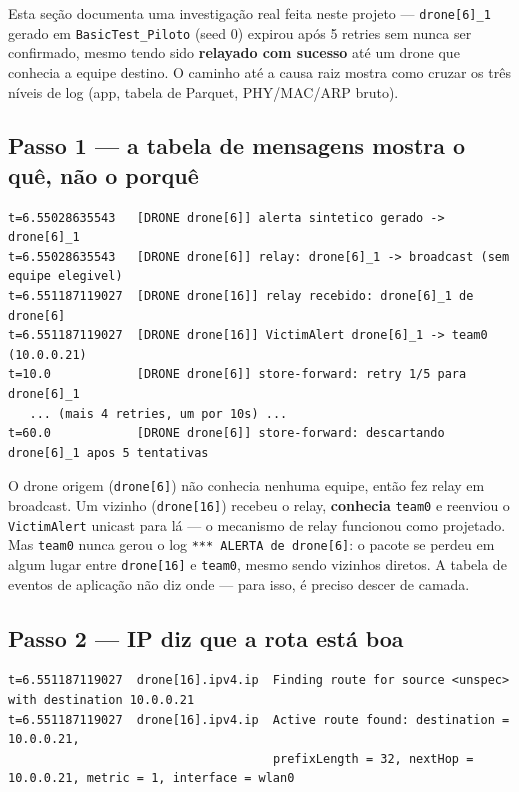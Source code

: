 \documentclass[11pt,a4paper]{article}
\begin{document}
Esta seção documenta uma investigação real feita neste projeto ---
\texttt{drone[6]\_1} gerado em \texttt{BasicTest\_Piloto} (seed 0) expirou
após 5 retries sem nunca ser confirmado, mesmo tendo sido \textbf{relayado
com sucesso} até um drone que conhecia a equipe destino. O caminho até a
causa raiz mostra como cruzar os três níveis de log (app, tabela de
Parquet, PHY/MAC/ARP bruto).

\subsection{Passo 1 --- a tabela de mensagens mostra o quê, não o porquê}

\begin{lstlisting}[style=simlog]
t=6.55028635543   [DRONE drone[6]] alerta sintetico gerado -> drone[6]_1
t=6.55028635543   [DRONE drone[6]] relay: drone[6]_1 -> broadcast (sem equipe elegivel)
t=6.551187119027  [DRONE drone[16]] relay recebido: drone[6]_1 de drone[6]
t=6.551187119027  [DRONE drone[16]] VictimAlert drone[6]_1 -> team0 (10.0.0.21)
t=10.0            [DRONE drone[6]] store-forward: retry 1/5 para drone[6]_1
   ... (mais 4 retries, um por 10s) ...
t=60.0            [DRONE drone[6]] store-forward: descartando drone[6]_1 apos 5 tentativas
\end{lstlisting}

\begin{explica}
O drone origem (\texttt{drone[6]}) não conhecia nenhuma equipe, então fez
relay em broadcast. Um vizinho (\texttt{drone[16]}) recebeu o relay,
\textbf{conhecia} \texttt{team0} e reenviou o \texttt{VictimAlert} unicast
para lá --- o mecanismo de relay funcionou como projetado. Mas
\texttt{team0} nunca gerou o log \texttt{*** ALERTA de drone[6]}: o pacote
se perdeu em algum lugar entre \texttt{drone[16]} e \texttt{team0}, mesmo
sendo vizinhos diretos. A tabela de eventos de aplicação não diz onde ---
para isso, é preciso descer de camada.
\end{explica}

\subsection{Passo 2 --- IP diz que a rota está boa}

\begin{lstlisting}[style=simlog]
t=6.551187119027  drone[16].ipv4.ip  Finding route for source <unspec> with destination 10.0.0.21
t=6.551187119027  drone[16].ipv4.ip  Active route found: destination = 10.0.0.21,
                                     prefixLength = 32, nextHop = 10.0.0.21, metric = 1, interface = wlan0
\end{lstlisting}
\end{document}
